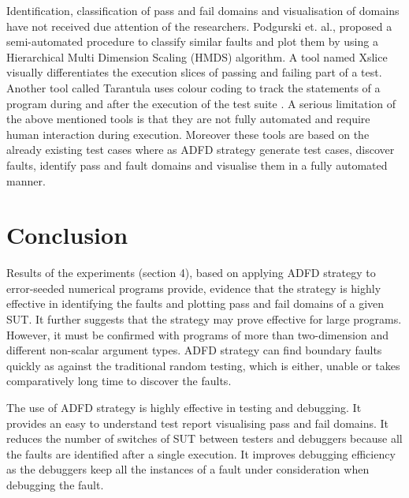 Identification, classification of pass and fail domains and visualisation of domains have not received due attention of the researchers. Podgurski et. al., \cite{Podgurski2003} proposed a semi-automated procedure to classify similar faults and plot them by using a Hierarchical Multi Dimension Scaling (HMDS) algorithm. A tool named Xslice \cite{agrawal1995fault} visually differentiates the execution slices of passing and failing part of a test. Another tool called Tarantula uses colour coding to track the statements of a program during and after the execution of the test suite \cite{Jones2002}. A serious limitation of the above mentioned tools is that they are not fully automated and require human interaction during execution. Moreover these tools are based on the already existing test cases where as ADFD strategy generate test cases, discover faults, identify pass and fault domains and visualise them in a fully automated manner. 


\section{Conclusion} \label{sec:conclusion}

Results of the experiments (section 4), based on applying ADFD strategy to error-seeded numerical programs provide, evidence that the strategy is highly effective in identifying the faults and plotting pass and fail domains of a given SUT. It further suggests that the strategy may prove effective for large programs. However, it must be confirmed with programs of more than two-dimension and different non-scalar argument types. ADFD strategy can find boundary faults quickly as against the traditional random testing, which is either, unable or takes comparatively long time to discover the faults.

The use of ADFD strategy is highly effective in testing and debugging. It provides an easy to understand test report visualising pass and fail domains. It reduces the number of switches of SUT between testers and debuggers because all the faults are identified after a single execution. It improves debugging efficiency as the debuggers keep all the instances of a fault under consideration when debugging the fault.








